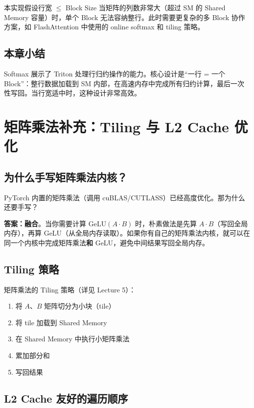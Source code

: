 \documentclass[a4paper]{article}
\begin{document}
\begin{warningbox}{本实现假设行宽 $\leq$ Block Size}
当矩阵的列数非常大（超过 SM 的 Shared Memory 容量）时，单个 Block 无法容纳整行。此时需要更复杂的多 Block 协作方案，如 FlashAttention 中使用的 online softmax 和 tiling 策略。
\end{warningbox}

\subsection{本章小结}

Softmax 展示了 Triton 处理行归约操作的能力。核心设计是``一行 = 一个 Block''：整行数据加载到 SM 内部，在高速内存中完成所有归约计算，最后一次性写回。当行宽适中时，这种设计非常高效。


\section{矩阵乘法补充：Tiling 与 L2 Cache 优化}

\subsection{为什么手写矩阵乘法内核？}

PyTorch 内置的矩阵乘法（调用 cuBLAS/CUTLASS）已经高度优化。那为什么还要手写？

\textbf{答案：融合}。当你需要计算 $\text{GeLU}(A \cdot B)$ 时，朴素做法是先算 $A \cdot B$（写回全局内存），再算 GeLU（从全局内存读取）。如果你有自己的矩阵乘法内核，就可以在同一个内核中完成矩阵乘法\textbf{和} GeLU，避免中间结果写回全局内存。

\subsection{Tiling 策略}

矩阵乘法的 Tiling 策略（详见 Lecture 5）：
\begin{enumerate}
    \item 将 $A$、$B$ 矩阵切分为小块（tile）
    \item 将 tile 加载到 Shared Memory
    \item 在 Shared Memory 中执行小矩阵乘法
    \item 累加部分和
    \item 写回结果
\end{enumerate}

\subsection{L2 Cache 友好的遍历顺序}
\end{document}
